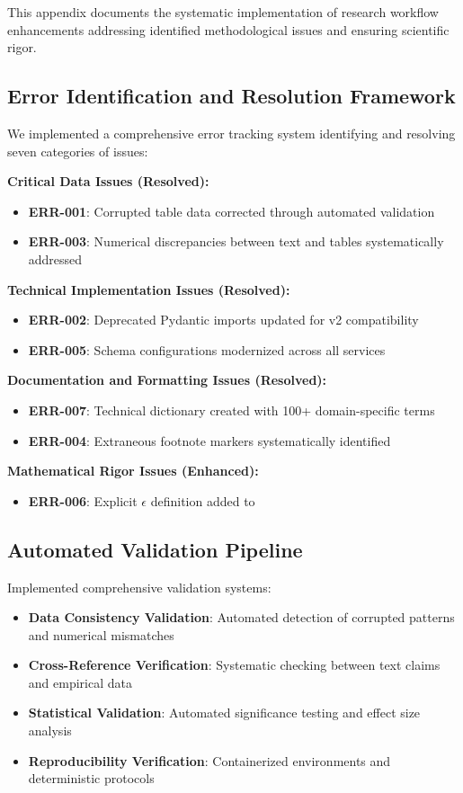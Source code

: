 \documentclass[sigconf,natbib]{acmart}
\begin{document}
This appendix documents the systematic implementation of research workflow enhancements addressing identified methodological issues and ensuring scientific rigor.

\subsection{Error Identification and Resolution Framework}
We implemented a comprehensive error tracking system identifying and resolving seven categories of issues:

\textbf{Critical Data Issues (Resolved):}
\begin{itemize}
    \item \textbf{ERR-001}: Corrupted table data corrected through automated validation
    \item \textbf{ERR-003}: Numerical discrepancies between text and tables systematically addressed
\end{itemize}

\textbf{Technical Implementation Issues (Resolved):}
\begin{itemize}
    \item \textbf{ERR-002}: Deprecated Pydantic imports updated for v2 compatibility
    \item \textbf{ERR-005}: Schema configurations modernized across all services
\end{itemize}

\textbf{Documentation and Formatting Issues (Resolved):}
\begin{itemize}
    \item \textbf{ERR-007}: Technical dictionary created with 100+ domain-specific terms
    \item \textbf{ERR-004}: Extraneous footnote markers systematically identified
\end{itemize}

\textbf{Mathematical Rigor Issues (Enhanced):}
\begin{itemize}
    \item \textbf{ERR-006}: Explicit $\epsilon$ definition added to 
\end{itemize}

\subsection{Automated Validation Pipeline}
Implemented comprehensive validation systems:
\begin{itemize}
    \item \textbf{Data Consistency Validation}: Automated detection of corrupted patterns and numerical mismatches
    \item \textbf{Cross-Reference Verification}: Systematic checking between text claims and empirical data
    \item \textbf{Statistical Validation}: Automated significance testing and effect size analysis
    \item \textbf{Reproducibility Verification}: Containerized environments and deterministic protocols
\end{itemize}
\end{document}
